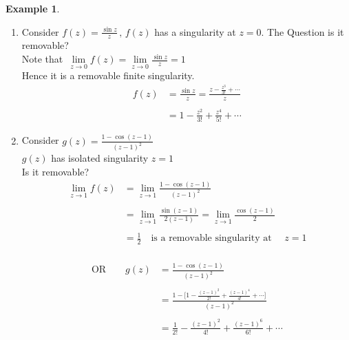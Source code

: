 \documentclass[11pt,a4paper]{article}
\theoremstyle{definition}
\newtheorem{example}[thm]{Example}
\begin{document}
\begin{example}
\begin{enumerate}
\item Consider $f(z) = \frac{\sin z}{z}\,,\,f(z)$ has a singularity at $z = 0$. The Question is it removable?\\

Note that $\, \lim\limits_{z\rightarrow 0} f(z) = \lim\limits_{z\rightarrow 0} \frac{\sin z}{z} = 1$\\

Hence it is a removable finite singularity.
\begin{align*}
f(z) & = \frac{\sin z}{z} = \frac{z - \frac{z^3}{3!} + \cdots}{z}\\\\
& = 1 - \frac{z^2}{3!} + \frac{z^4}{5!} + \cdots
\end{align*}

\item Consider $g(z) = \frac{1 - \cos (z - 1)}{(z - 1)^2}$\\

$g(z)$ has isolated singularity $ z = 1$\\

Is it removable?\\

\begin{align*}
\lim\limits_{z\rightarrow 1} f(z) & = \lim\limits_{z\rightarrow 1}\frac{1 - \cos (z - 1)}{(z - 1)^2}\\\\
& = \lim\limits_{z\rightarrow 1}\frac{\sin (z - 1)}{2(z - 1)}= \lim\limits_{z\rightarrow 1}\frac{\cos (z - 1)}{2}\\\\
& = \frac{1}{2}\quad \text{is a removable singularity at }\quad  z = 1\\
\end{align*}


\begin{align*}
\text{OR}\qquad  g(z) & = \frac{1 - \cos (z - 1)}{( z - 1)^2}\\\\
& = \frac{1 - \Big[1 - \frac{(z - 1)^2}{2!} + \frac{(z - 1)^4}{4!}+ \cdots\Big]}{(z - 1)^2}\\\\
& = \frac{1}{2!} - \frac{(z - 1)^2}{4!} + \frac{(z - 1)^6}{6!}+ \cdots\\\\
\end{align*}
\end{enumerate}
\end{example}
\end{document}
